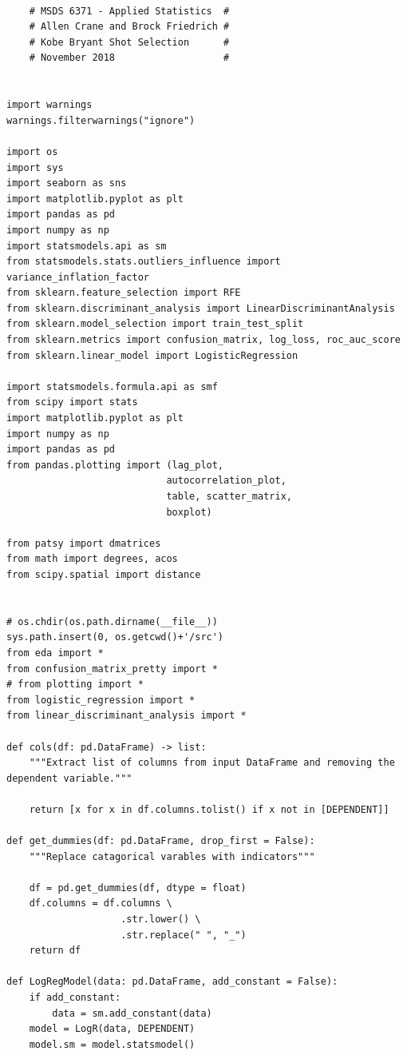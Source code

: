 \begin{verbatim}

    # MSDS 6371 - Applied Statistics  #
    # Allen Crane and Brock Friedrich #
    # Kobe Bryant Shot Selection      #
    # November 2018                   #


import warnings
warnings.filterwarnings("ignore")

import os
import sys
import seaborn as sns
import matplotlib.pyplot as plt
import pandas as pd
import numpy as np
import statsmodels.api as sm
from statsmodels.stats.outliers_influence import variance_inflation_factor
from sklearn.feature_selection import RFE
from sklearn.discriminant_analysis import LinearDiscriminantAnalysis
from sklearn.model_selection import train_test_split
from sklearn.metrics import confusion_matrix, log_loss, roc_auc_score
from sklearn.linear_model import LogisticRegression

import statsmodels.formula.api as smf
from scipy import stats
import matplotlib.pyplot as plt
import numpy as np
import pandas as pd
from pandas.plotting import (lag_plot,
							autocorrelation_plot,
							table, scatter_matrix,
							boxplot)

from patsy import dmatrices
from math import degrees, acos
from scipy.spatial import distance


# os.chdir(os.path.dirname(__file__))
sys.path.insert(0, os.getcwd()+'/src')
from eda import *
from confusion_matrix_pretty import *
# from plotting import *
from logistic_regression import *
from linear_discriminant_analysis import *

def cols(df: pd.DataFrame) -> list:
    """Extract list of columns from input DataFrame and removing the dependent variable."""

    return [x for x in df.columns.tolist() if x not in [DEPENDENT]]

def get_dummies(df: pd.DataFrame, drop_first = False):
    """Replace catagorical varables with indicators"""

    df = pd.get_dummies(df, dtype = float)
    df.columns = df.columns \
                    .str.lower() \
                    .str.replace(" ", "_")
    return df

def LogRegModel(data: pd.DataFrame, add_constant = False):
    if add_constant:
        data = sm.add_constant(data)
    model = LogR(data, DEPENDENT)
    model.sm = model.statsmodel()


\end{verbatim}
